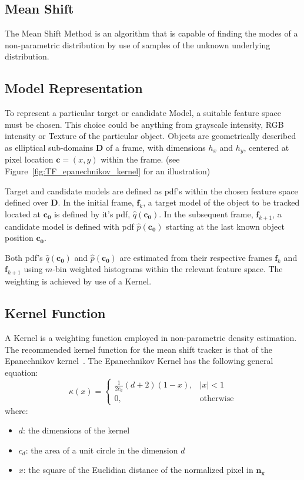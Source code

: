 \subsection{Mean Shift}\label{theoretical_framework_mean_shift}
The Mean Shift Method is an algorithm that is capable of finding the modes of a 
non-parametric distribution by use of samples of the unknown underlying distribution. 

\subsection{Model Representation}
To represent a particular target or candidate Model, a suitable feature space
must be chosen. This choice could be anything from grayscale intensity, RGB
intensity or Texture of the particular object. Objects are geometrically described 
as elliptical sub-domains $\mathbf{D}$ of a frame, with dimensions $h_x$ and
$h_y$, centered at pixel location $\mathbf{c}=(x,y)$ within the frame. (see
Figure~\ref{fig:TF_epanechnikov_kernel} for an illustration)

Target and candidate models are defined as pdf's within the chosen feature
space defined over $\mathbf{D}$. In the initial frame, $\mathbf{f}_k$, a target
model of the object to be tracked located at $\mathbf{c_0}$ is defined by it's
pdf, $\hat{q}(\mathbf{c_0})$. In the subsequent frame, $\mathbf{f}_{k+1}$, a
candidate model is defined with pdf $\hat{p}(\mathbf{c_0})$ starting at the last
known object position $\mathbf{c_0}$. 

Both pdf's $\hat{q}(\mathbf{c_0})$ and $\hat{p}(\mathbf{c_0})$ are estimated from
their respective frames $\mathbf{f}_k$ and $\mathbf{f}_{k+1}$ using $m$-bin
weighted histograms within the relevant feature space. The weighting is achieved
by use of a Kernel. 

\subsection{Kernel Function}
A Kernel is a weighting function employed in non-parametric density estimation.
The recommended kernel function for the mean shift tracker is that of the
Epanechnikov kernel~\cite{Comaniciu2002}.
The Epanechnikov Kernel has the following general equation:
\begin{equation}
    \kappa(x)=
    \begin{cases}
        \frac{1}{2c_d}(d+2)(1-x), & |x|<1 \\
        0, & \text{otherwise}
    \end{cases}
\end{equation}
where:
\begin{itemize}
   \item $d$: the dimensions of the kernel
   \item $c_d$: the area of a unit circle in the dimension $d$
   \item $x$: the square of the Euclidian distance of the normalized pixel in
       $\mathbf{n_x}$
\end{itemize}

